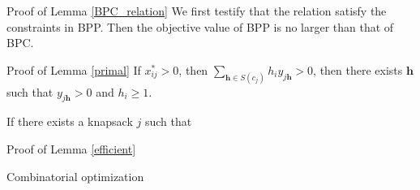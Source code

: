 \begin{pf}{Proof of Lemma \ref{BPC_relation}}
We first testify that the relation satisfy the constraints in BPP. Then the objective value of BPP is no larger than that of BPC.


\end{pf}

\begin{pf}{Proof of Lemma \ref{primal}}
  If $x_{ij}^{*}>0$, then $\sum_{\bm{h} \in S(c_{j})} h_i y_{j \bm{h}} >0$, then there exists $\bm{h}$ such that $y_{j \bm{h}} >0$ and $h_{i} \geq 1$.

  If there exists a knapsack $j$ such that
\end{pf}

\begin{pf}{Proof of Lemma \ref{efficient}}

\end{pf}


Combinatorial optimization
\newpage